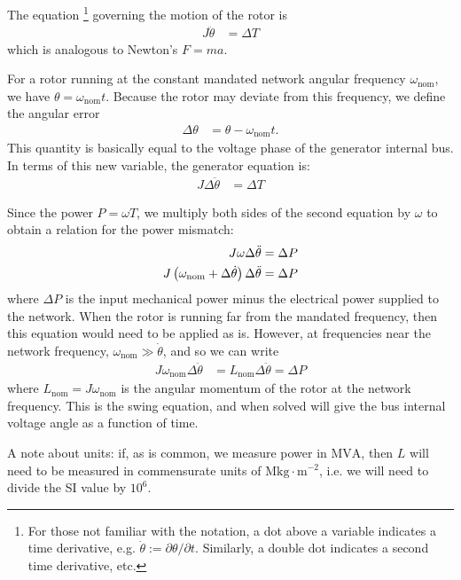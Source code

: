 \documentclass[10pt]{article}
\begin{document}
The equation \footnote{For those not familiar with the notation, a dot above a variable indicates a time derivative, e.g. $\dot{\theta} := \partial \theta / \partial t$. Similarly, a double dot indicates a second time derivative, etc.} governing the motion of the rotor is
\begin{align}
	J \ddot{\theta} &= \Delta T
\end{align}
which is analogous to Newton's $F = ma$.

For a rotor running at the constant mandated network angular frequency $\omega_\text{nom}$, we have $\theta = \omega_\text{nom} t$. Because the rotor may deviate from this frequency, we define the angular error
\begin{align}
	\Delta \theta &= \theta - \omega_\text{nom} t. \label{EQ_DEFN_DELTA_THETA}
\end{align}
This quantity is basically equal to the voltage phase of the generator internal bus. In terms of this new variable, the generator equation is:
\begin{align}
	J \Delta \ddot{\theta} &= \Delta T
\end{align}

Since the power $P = \omega T$, we multiply both sides of the second equation by $\omega$ to obtain a relation for the power mismatch:
\begin{align}
	J\omega \Delta \ddot{\theta} &= \Delta P \notag \\
	J\left(\omega_\text{nom} + \Delta \dot{\theta}\right) \Delta\ddot{\theta} &= \Delta P
\end{align}
where $\Delta P$ is the input mechanical power minus the electrical power supplied to the network. When the rotor is running far from the mandated frequency, then this equation would need to be applied as is. However, at frequencies near the network frequency, $\omega_\text{nom} \gg \dot{\theta}$, and so we can write
\begin{align}
	J\omega_\text{nom} \Delta\ddot{\theta} &= L_\text{nom} \Delta\ddot{\theta} = \Delta P \label{EQ_SWING}
\end{align}
where $L_\text{nom} = J \omega_\text{nom}$ is the angular momentum of the rotor at the network frequency. This is the swing equation, and when solved will give the bus internal voltage angle as a function of time.

A note about units: if, as is common, we measure power in $\mathrm{MVA}$, then $L$ will need to be measured in commensurate units of $\mathrm{Mkg\cdot m^{-2}}$, i.e. we will need to divide the SI value by $10^6$.
\end{document}
